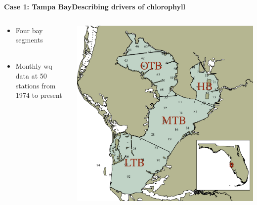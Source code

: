 \documentclass[serif]{beamer}\usepackage[]{graphicx}\usepackage[]{color}
\begin{document}
\begin{frame}{\textbf{Case 1: Tampa Bay}}{\textbf{Describing drivers of chlorophyll}}
\begin{columns}
\begin{column}{0.5\textwidth}
\begin{itemize}
\item Four bay segments\\~\\
\item Monthly wq data at 50 stations from 1974 to present \\~\\
\end{itemize}
\vspace{0cm}\hspace*{15pt}
\end{column}
\begin{column}{0.5\textwidth}
\centerline{\includegraphics[width = \textwidth]{fig/tb_map.pdf}}
\end{column}
\end{columns}
\end{frame}
\end{document}
